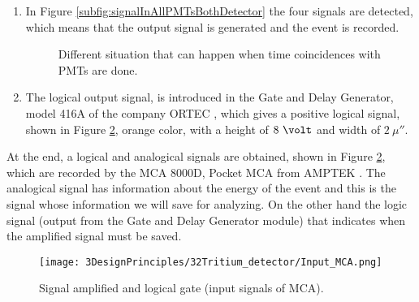 \begin{enumerate}
\begin{enumerate}
\begin{enumerate}
\item{} In Figure \ref{subfig:signalInAllPMTsBothDetector} the four signals are detected, which means that the output signal is generated and the event is recorded.

\begin{figure}[h]
 \centering
   \newline
 \caption{Different situation that can happen when time coincidences with PMTs are done.}
 \label{fig:DifferentCoincidences}
\end{figure}

\item{} The logical output signal, is introduced in the Gate and Delay Generator, model 416A of the company ORTEC \cite{DataSheetGateAndDelay}, which gives a positive logical signal, shown in Figure \ref{fig:InputSignalsMCA}, orange color, with a height of $8~\volt$ and width of $2~\mu\second$.

\end{enumerate}

\end{enumerate}

\end{enumerate}

At the end, a logical and analogical signals are obtained, shown in Figure \ref{fig:InputSignalsMCA}, which are recorded by the MCA 8000D, Pocket MCA from AMPTEK \cite{DataSheetMCA}. The analogical signal has information about the energy of the event and this is the signal whose information we will save for analyzing. On the other hand the logic signal (output from the Gate and Delay Generator module) that indicates when the amplified signal must be saved.

\begin{figure}[htbp]
\centering
\texttt{[image: 3DesignPrinciples/32Tritium\_detector/Input\_MCA.png]}
\caption{Signal amplified and logical gate (input signals of MCA).\label{fig:InputSignalsMCA}}
\end{figure}

